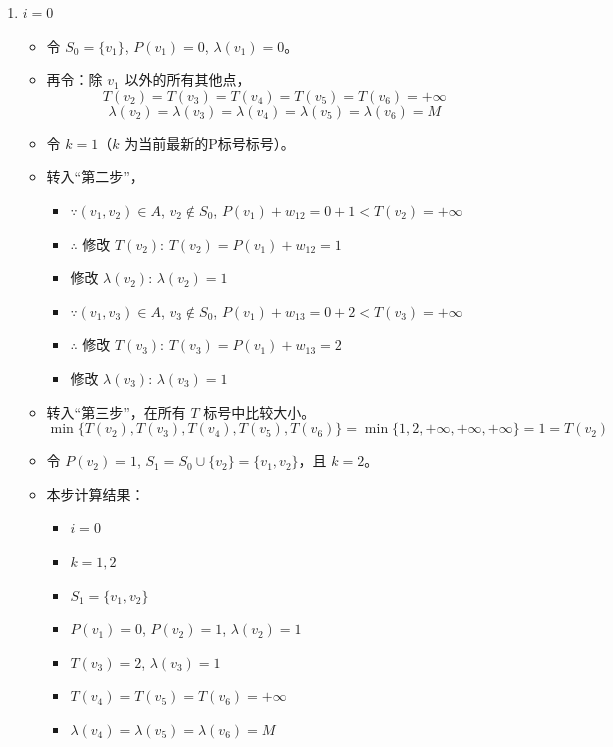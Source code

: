 \begin{enumerate}[label=(\arabic*)]
    \item \( i = 0 \)
    \begin{itemize}
        \item 令 \( S_0 = \{v_1\} \), \( P(v_1) = 0 \), \( \lambda(v_1) = 0 \)。
        \item 再令：除 \( v_1 \) 以外的所有其他点，
        \[
        T(v_2) = T(v_3) = T(v_4) = T(v_5) = T(v_6) = +\infty
        \]
        \[
        \lambda(v_2) = \lambda(v_3) = \lambda(v_4) = \lambda(v_5) = \lambda(v_6) = M
        \]
        \item 令 \( k = 1 \)（\( k \) 为当前最新的P标号标号）。
        \item 转入“第二步”，
        \begin{itemize}
            \item \(\because (v_1, v_2) \in A\), \( v_2 \notin S_0 \), \( P(v_1) + w_{12} = 0 + 1 < T(v_2) = +\infty \)
            \item \(\therefore\) 修改 \( T(v_2) \): \( T(v_2) = P(v_1) + w_{12} = 1 \)
            \item 修改 \( \lambda(v_2) \): \( \lambda(v_2) = 1 \)
            \item \(\because (v_1, v_3) \in A\), \( v_3 \notin S_0 \), \( P(v_1) + w_{13} = 0 + 2 < T(v_3) = +\infty \)
            \item \(\therefore\) 修改 \( T(v_3) \): \( T(v_3) = P(v_1) + w_{13} = 2 \)
            \item 修改 \( \lambda(v_3) \): \( \lambda(v_3) = 1 \)
        \end{itemize}
        \item 转入“第三步”，在所有 \( T \) 标号中比较大小。
        \[
        \min\{T(v_2), T(v_3), T(v_4), T(v_5), T(v_6)\} = \min\{1, 2, +\infty, +\infty, +\infty\} = 1 = T(v_2)
        \]
        \item 令 \( P(v_2) = 1 \), \( S_1 = S_0 \cup \{v_2\} = \{v_1, v_2\} \)，且 \( k = 2 \)。
        \item 本步计算结果：
        \begin{itemize}
            \item \( i = 0 \)
            \item \( k = 1, 2 \)
            \item \( S_1 = \{v_1, v_2\} \)
            \item \( P(v_1) = 0 \), \( P(v_2) = 1 \), \( \lambda(v_2) = 1 \)
            \item \( T(v_3) = 2 \), \( \lambda(v_3) = 1 \)
            \item \( T(v_4) = T(v_5) = T(v_6) = +\infty \)
            \item \( \lambda(v_4) = \lambda(v_5) = \lambda(v_6) = M \)
        \end{itemize}
    \end{itemize}


\end{enumerate}
